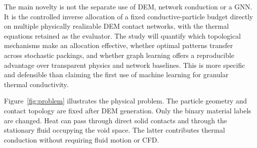 \documentclass[12pt,a4paper]{article}
\begin{document}
The main novelty is not the separate use of DEM, network conduction or a GNN.
It is the controlled inverse allocation of a fixed conductive-particle budget
directly on multiple physically realizable DEM contact networks, with the
thermal equations retained as the evaluator. The study will quantify which
topological mechanisms make an allocation effective, whether optimal patterns
transfer across stochastic packings, and whether graph learning offers a
reproducible advantage over transparent physics and network baselines. This is
more specific and defensible than claiming the first use of machine learning
for granular thermal conductivity.

Figure~\ref{fig:problem} illustrates the physical problem. The particle geometry
and contact topology are fixed after DEM generation. Only the binary material
labels are changed. Heat can pass through direct solid contacts and through the
stationary fluid occupying the void space. The latter contributes thermal
conduction without requiring fluid motion or CFD.
\end{document}
